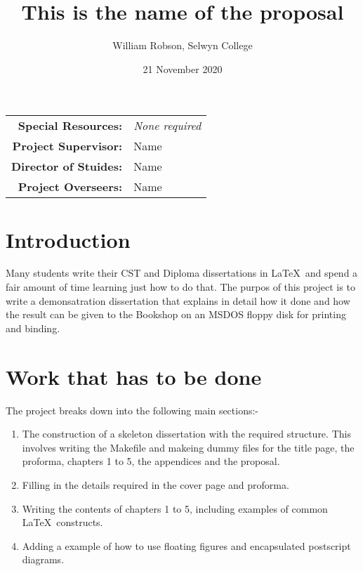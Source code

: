 \documentclass[12pt,a4paper, headings=standardclasses]{scrartcl}
\begin{document}
\title{This is the name of the proposal}
\author{William Robson, Selwyn College}
\date{21 November 2020}

\maketitle

\begin{center}
\begin{tabular}{rl}
    \textbf{Special Resources:} & \textit{None required} \\
    \textbf{Project Supervisor:} & Name \\
    \textbf{Director of Stuides:} & Name \\
    \textbf{Project Overseers:} & Name \\
\end{tabular}
\end{center}

\vspace{2cm}

\section*{Introduction}

Many students write their CST and Diploma dissertations in \LaTeX\ and
spend a fair amount of time learning just how to do that. The purpos of 
this project is to write a demonsatration dissertation that explains in
detail how it done and how the result can be given to the Bookshop
on an MSDOS floppy disk for printing and binding.

\section*{Work that has to be done}

The project breaks down into the following main sections:-

\begin{enumerate}

\item The construction of a skeleton dissertation with the required 
structure. This involves writing the Makefile and makeing dummy files
for the title page, the proforma, chapters 1 to 5, the appendices and
the proposal.

\item Filling in the details required in the cover page and proforma.

\item Writing the contents of chapters 1 to 5, including examples
of common \LaTeX\ constructs.

\item Adding a example of how to use floating figures and encapsulated
postscript diagrams.

\end{enumerate}
\end{document}
